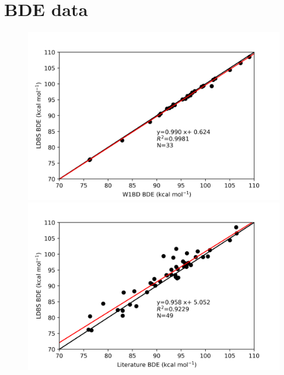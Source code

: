 
\chapter{BDE data}\label{ap:bde}

\begin{figure}
\hspace*{-1.5cm}
\begin{minipage}{8cm}
  \centering
  \includegraphics[width=\textwidth]{figures/w1bd-ldbs}
\end{minipage}%
\begin{minipage}{8cm}
  \centering
  \includegraphics[width=\textwidth]{figures/lit-ldbs}
\end{minipage}
\end{figure}

